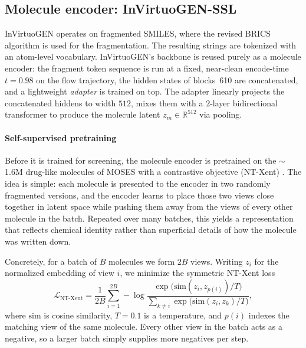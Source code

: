 \documentclass[10pt]{article}
\newcommand{\dAdapter}{512}\newcommand{\dProtein}{1280}
\newcommand{\bbBlocks}{6\text{--}10}     %
\newcommand{\encodeTime}{0.98}
\newcommand{\sslTemp}{0.1}\newcommand{\ebmTemp}{0.1}
\begin{document}
\subsection{Molecule encoder: InVirtuoGEN-SSL}
InVirtuoGEN operates on fragmented SMILES, where the revised BRICS algorithm \citep{rbrics} is used for the fragmentation. The resulting strings are tokenized with an atom-level vocabulary. InVirtuoGEN's backbone is reused purely as a molecule encoder: the fragment token
sequence is run at a fixed, near-clean encode-time $t=\encodeTime$ on the flow
trajectory, the hidden states of blocks~\bbBlocks{} are concatenated, and a
lightweight \emph{adapter} is trained on top.
The adapter linearly projects the concatenated hiddens to width $\dAdapter$, mixes
them with a $2$-layer bidirectional transformer to produce the molecule latent
$z_m\in\mathbb{R}^{\dAdapter}$ via pooling.

\paragraph{Self-supervised pretraining}\label{sec:ssl}
Before it is trained for screening, the molecule encoder is pretrained on the
$\sim$1.6M drug-like molecules of MOSES \citep{polykovskiy2020moses} with a
contrastive objective (NT-Xent) \citep{chen2020simpleframeworkcontrastivelearning}.
The idea is simple: each molecule is presented to the encoder in two randomly
fragmented versions, and the encoder learns to place those two views close together in
latent space while pushing them away from the views of every other molecule in the
batch. Repeated over many batches, this yields a representation that reflects
chemical identity rather than superficial details of how the molecule was written
down.

Concretely, for a batch of $B$ molecules we form $2B$ views. Writing $z_i$ for the
normalized embedding of view $i$, we minimize the symmetric NT-Xent loss
\begin{equation}
\mathcal{L}_{\text{NT-Xent}}
= \frac{1}{2B}\sum_{i=1}^{2B}
-\log\frac{\exp\!\big(\mathrm{sim}(z_i, z_{p(i)})/T\big)}
{\sum_{k\neq i}\exp\!\big(\mathrm{sim}(z_i, z_k)/T\big)},
\label{eq:ntxent}
\end{equation}
where $\mathrm{sim}$ is cosine similarity, $T=\sslTemp$ is a temperature, and
$p(i)$ indexes the matching view of the same molecule. Every other view in the
batch acts as a negative, so a larger batch simply supplies more negatives per
step.
\end{document}
